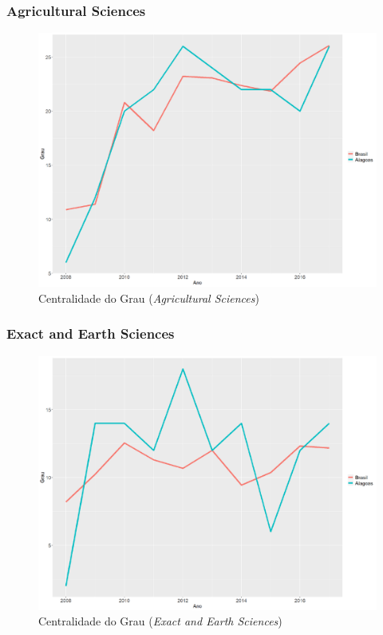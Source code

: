 \subsubsection{Agricultural Sciences}

\begin{figure}[H]
	\centering
	\includegraphics[scale=0.4]{Imagens/agricultural/graf-linha-degree-br-al.pdf}
	\caption{Centralidade do Grau (\textit{Agricultural Sciences})}
	\label{degree-agri-1}
\end{figure}

\subsubsection{Exact and Earth Sciences}

\begin{figure}[H]
	\centering
	\includegraphics[scale=0.4]{Imagens/exact/graf-linha-degree-br-al.pdf}
	\caption{Centralidade do Grau (\textit{Exact and Earth Sciences})}
	\label{degree-exact-1}
\end{figure}

